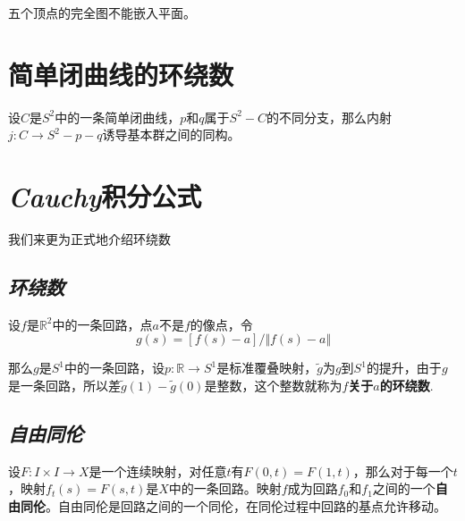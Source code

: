 \begin{mdframed}
    \begin{theorem}
        五个顶点的完全图不能嵌入平面。
    \end{theorem}
\end{mdframed}

\section{简单闭曲线的环绕数}

\begin{mdframed}
    \begin{theorem}
        设$C$是$S^2$中的一条简单闭曲线，$p$和$q$属于$S^2-C$的不同分支，那么内射$j:C\rightarrow S^2-p-q$诱导基本群之间的同构。
    \end{theorem}
\end{mdframed}

\section{\textsl{Cauchy}积分公式}

我们来更为正式地介绍环绕数

\subsection*{\textsl{环绕数}}
\begin{define}
    设$f$是$\mathbb{R}^2$中的一条回路，点$a$不是$f$的像点，令
    \begin{equation}
        g(s)=[f(s)-a]/\Vert f(s)-a\Vert
    \end{equation}

    那么$g$是$S^1$中的一条回路，设$p:\mathbb{R}\rightarrow S^1$是标准覆叠映射，$\tilde{g}$为$g$到$S^1$的提升，由于$g$是一条回路，所以差$\tilde{g}(1)-\tilde{g}(0)$是整数，这个整数就称为\textbf{$f$关于$a$的环绕数}.
\end{define}

\subsection*{\textsl{自由同伦}}

\begin{define}
    设$F:I\times I\rightarrow X$是一个连续映射，对任意$t$有$F(0,t)=F(1,t)$，那么对于每一个$t$，映射$f_t(s)=F(s,t)$是$X$中的一条回路。映射$f$成为回路$f_0$和$f_1$之间的一个\textbf{自由同伦}。自由同伦是回路之间的一个同伦，在同伦过程中回路的基点允许移动。
\end{define}

